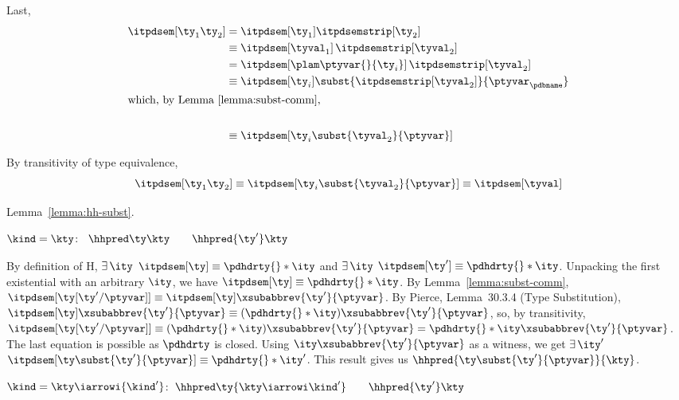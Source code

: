 \begin{list}{\textbf{Proof:}}{
      \setlength{\leftmargin}{0in}
      \setlength{\listparindent}{0in}}
\begin{caseproof}
Last,
\begin{align*}
\itpdsem[{\ty_1} {\ty_2}] &= \itpdsem[{\ty_1}] \itpdsemstrip[{\ty_2}]\\
&\equiv \itpdsem[{\tyval_1}] \, \itpdsemstrip[{\tyval_2}]\\
&= \itpdsem[{\plam \ptyvar {} {\ty_i}}] \, \itpdsemstrip[{\tyval_2}]\\
&\equiv \itpdsem[{\ty_i}] \subst{\itpdsemstrip[{\tyval_2}]}{\ptyvar_\pdbname}\\
\intertext{which, by Lemma~\ref{lemma:subst-comm},}\\
&\equiv \itpdsem[{\ty_i}\subst{\tyval_2}{\ptyvar}]  
\end{align*}

By transitivity of type equivalence,
\[
\itpdsem[{\ty_1} {\ty_2}] \equiv
\itpdsem[{\ty_i}\subst{\tyval_2}{\ptyvar}]  \equiv \itpdsem[\tyval]
\]
\end{caseproof}

\item Lemma~\ref{lemma:hh-subst}.
\begin{caseproof}
\item ${\kind} = \kty$:\quad
  $\begin{array}[t]{l}
    \hhpred \ty \kty \qquad
    \hhpred {\ty'} \kty
  \end{array}$

   By definition of $\mathrm{H}$,
     $\exists\,\ity$ \suchthat{} $\itpdsem[\ty] \equiv \pdhdrty{} *
     \ity$ and
     $\exists\,\ity$ \suchthat{} $\itpdsem[\ty'] \equiv \pdhdrty{} * \ity$.
   Unpacking the first existential with an arbitrary $\ity$, we have $\itpdsem[\ty] \equiv \pdhdrty{} * \ity$. 
   By Lemma~\ref{lemma:subst-comm},\linebreak[0]
     $\itpdsem[{\ty[{\ty'}/\ptyvar]}] \equiv \itpdsem[\ty]\xsubabbrev{{\ty'}}{\ptyvar}$.
   By Pierce, Lemma~30.3.4 (Type Substitution),
     $\itpdsem[\ty]\xsubabbrev{{\ty'}}{\ptyvar} \equiv (\pdhdrty{} * \ity)\xsubabbrev{{\ty'}}{\ptyvar}$,
   so, by transitivity,
     $\itpdsem[{\ty[{\ty'}/\ptyvar]}] \equiv (\pdhdrty{} *
     \ity)\xsubabbrev{{\ty'}}{\ptyvar} = \pdhdrty{} *
     \ity\xsubabbrev{{\ty'}}{\ptyvar}$. The last equation is possible
     as $\pdhdrty$ is closed.
   Using $\ity\xsubabbrev{{\ty'}}{\ptyvar}$ as a witness, we get $\exists\,\ity'$ \suchthat{} $\itpdsem[\ty\subst{\ty'}{\ptyvar}] \equiv \pdhdrty{} * \ity'$.
   This result gives us $\hhpred {\ty\subst{\ty'}{\ptyvar}}{\kty}$.

\item ${\kind} = \kty \iarrowi {\kind'}$:\quad $\begin{array}[t]{l}
    \hhpred \ty {\kty \iarrowi \kind'} \qquad
    \hhpred {\ty'} \kty
  \end{array}$


\end{caseproof}
\end{list}
